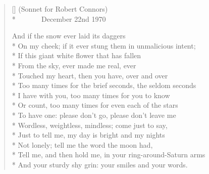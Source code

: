 \label{ch:the_oldest_love_poem}
\settowidth{\versewidth}{Tell me, and then hold me, in your ring-around-Saturn arms}
\begin{verse}[\versewidth]
           (Sonnet for Robert Connors)\\*
                 December 22nd 1970

And if the snow ever laid its daggers\\*
On my cheek; if it ever stung them in unmalicious intent;\\*
If this giant white flower that has fallen\\*
From the sky, ever made me real, ever\\*
Touched my heart, then you have, over and over\\*
Too many times for the brief seconds, the seldom seconds\\*
I have with you, too many times for you to know\\*
Or count, too many times for even each of the stars\\*
To have one: please don't go, please don't leave me\\*
Wordless, weightless, mindless; come just to say,\\*
Just to tell me, my day is bright and my nights\\*
Not lonely; tell me the word the moon had,\\*
Tell me, and then hold me, in your ring-around-Saturn arms\\*
And your sturdy shy grin: your smiles and your words.
\end{verse}
